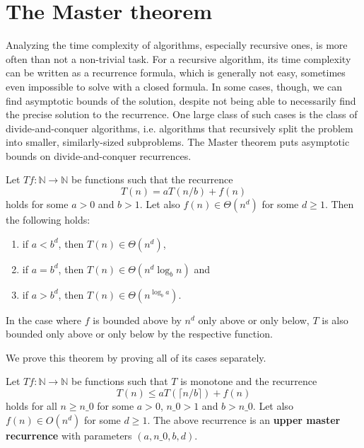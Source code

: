 \chapter{The Master theorem}

Analyzing the time complexity of algorithms, especially recursive ones, is more often 
than not a non-trivial task. For a recursive algorithm, its time complexity can be 
written as a recurrence formula, which is generally not easy, sometimes even impossible 
to solve with a closed formula. In some cases, though, we can find asymptotic bounds 
of the solution, despite not being able to necessarily find the 
precise solution to the recurrence. One large class of such cases is the class of 
divide-and-conquer algorithms, i.e. algorithms that recursively split the
problem into smaller, similarly-sized subproblems. The Master theorem puts asymptotic 
bounds on divide-and-conquer recurrences.

\begin{theorem}
    Let $T f : \mathbb{N} \rightarrow \mathbb{N}$ be functions such that the recurrence
    \[
        T(n) = a T(n/b) + f(n)
    \]
    holds for some $a > 0$ and $b > 1$. Let also $f(n) \in \Theta(n^d)$ for some $d \ge 1$. 
    Then the following holds:
    \begin{enumerate}
        \item if $a < b^d$, then $T(n) \in \Theta(n^d)$,
        \item if $a = b^d$, then $T(n) \in \Theta(n^d \log_b{n})$ and
        \item if $a > b^d$, then $T(n) \in \Theta(n^{\log_b{a}})$.
    \end{enumerate}
    In the case where $f$ is bounded above by $n^d$ only above or only below,
    $T$ is also bounded only above or only below by the respective function.
\end{theorem}

We prove this theorem by proving all of its cases separately. 

\begin{definition}
    \label{def:upper_master_rec}
    \leanok
    Let $T f : \mathbb{N} \rightarrow \mathbb{N}$ be functions such that $T$ 
    is monotone and the recurrence
    \[
        T(n) \leq a T(\lceil n/b \rceil) + f(n)
    \]
    holds for all $n \ge n\_0$ for some $a > 0$, $n\_0 > 1$ and $b > n\_0$. 
    Let also $f(n) \in O(n^d)$ for some $d \ge 1$. The above recurrence 
    is an \textbf{upper master recurrence} with parameters $(a, n\_0, b, d)$.
\end{definition}

